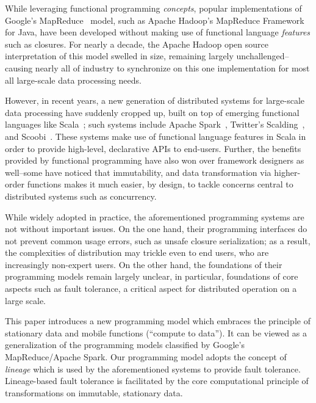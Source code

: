 \documentclass{jfp1}
\begin{document}
While leveraging functional programming {\em concepts}, popular implementations
of \\Google's MapReduce~\cite{MapReduce} model, such as Apache Hadoop's MapReduce
Framework~\cite{Hadoop} for Java, have been developed without making use of
functional language {\em features} such as closures. For nearly a decade, the
Apache Hadoop open source interpretation of this model swelled in size,
remaining largely unchallenged--causing nearly all of industry to synchronize on
this one implementation for most all large-scale data processing needs.

However, in recent years, a new generation of distributed systems for
large-scale data processing have suddenly cropped up, built on top of emerging
functional languages like Scala~\cite{Odersky10}; such systems include Apache
Spark~\cite{Spark}, Twitter's Scalding~\cite{Scalding}, and
Scoobi~\cite{Scoobi}. These systems make use of functional language features in
Scala in order to provide high-level, declarative APIs to end-users. Further,
the benefits provided by functional programming have also won over framework
designers as well--some have noticed that immutability, and data transformation
via higher-order functions makes it much easier, by design, to tackle concerns
central to distributed systems such as concurrency.

While widely adopted in practice, the aforementioned programming systems are not
without important issues. On the one hand, their programming interfaces do not
prevent common usage errors, such as unsafe closure serialization; as a result,
the complexities of distribution may trickle even to end users, who are
increasingly non-expert users. On the other hand, the foundations of their
programming models remain largely unclear, in particular, foundations of core
aspects such as fault tolerance, a critical aspect for distributed operation on
a large scale.

This paper introduces a new programming model which embraces the principle of
stationary data and mobile functions (``compute to data''). It can be viewed as
a generalization of the programming models classified by Google's
MapReduce/Apache Spark. Our programming model adopts the concept of {\em
lineage} which is used by the aforementioned systems to provide fault tolerance.
Lineage-based fault tolerance is facilitated by the core computational principle
of transformations on immutable, stationary data.
\end{document}
